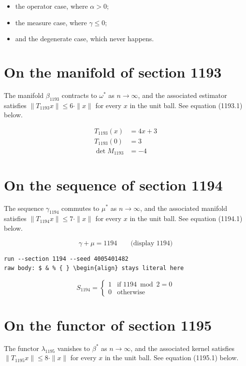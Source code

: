 \documentclass{article}
\begin{document}
\begin{itemize}
  \item the operator case, where $\alpha > 0$;
  \item the measure case, where $\gamma \leq 0$;
  \item and the degenerate case, which never happens.
\end{itemize}

\section{On the manifold of section 1193}
The manifold $\beta_{1193}$ contracts to $\omega^{*}$ as $n \to \infty$,
and the associated estimator satisfies $\|T_{1193} x\| \leq 6 \cdot \|x\|$
for every $x$ in the unit ball. See equation (1193.1) below.

\begin{align}
T_{1193}(x) &= 4 x + 3 \\
T_{1193}(0) &= 3 \\
\det M_{1193} &= -4
\end{align}

\section{On the sequence of section 1194}
The sequence $\gamma_{1194}$ commutes to $\mu^{*}$ as $n \to \infty$,
and the associated manifold satisfies $\|T_{1194} x\| \leq 7 \cdot \|x\|$
for every $x$ in the unit ball. See equation (1194.1) below.

$$
\gamma + \mu = 1194 \qquad \text{(display 1194)}
$$

\begin{verbatim}
run --section 1194 --seed 4005401482
raw body: $ & % { } \begin{align} stays literal here
\end{verbatim}

\begin{equation}
S_{1194} = \begin{cases} 1 & \text{if } 1194 \bmod 2 = 0 \\ 0 & \text{otherwise} \end{cases}
\end{equation}

\section{On the functor of section 1195}
The functor $\lambda_{1195}$ vanishes to $\beta^{*}$ as $n \to \infty$,
and the associated kernel satisfies $\|T_{1195} x\| \leq 8 \cdot \|x\|$
for every $x$ in the unit ball. See equation (1195.1) below.
\end{document}

